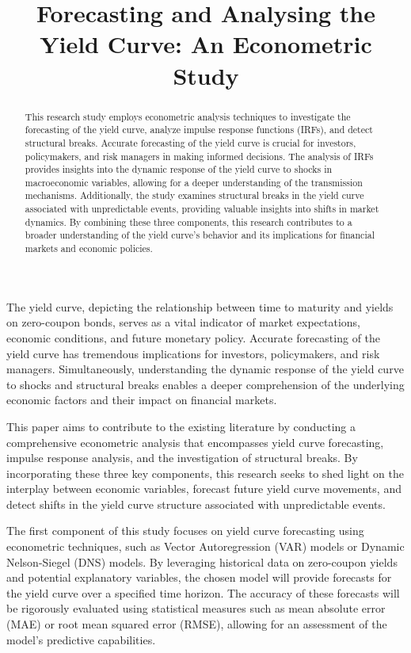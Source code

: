 \documentclass{vegaarticle}
\author{}
\title{Forecasting and Analysing the Yield Curve: An Econometric Study}
\date{}
\begin{document}
    \maketitle

    \begin{abstract}{}
        This research study employs econometric analysis techniques to investigate the forecasting of the yield curve, analyze impulse response functions (IRFs), and detect structural breaks. Accurate forecasting of the yield curve is crucial for investors, policymakers, and risk managers in making informed decisions. The analysis of IRFs provides insights into the dynamic response of the yield curve to shocks in macroeconomic variables, allowing for a deeper understanding of the transmission mechanisms. Additionally, the study examines structural breaks in the yield curve associated with unpredictable events, providing valuable insights into shifts in market dynamics. By combining these three components, this research contributes to a broader understanding of the yield curve's behavior and its implications for financial markets and economic policies.
    \end{abstract}

    \introduction
        The yield curve, depicting the relationship between time to maturity and yields on zero-coupon bonds, serves as a vital indicator of market expectations, economic conditions, and future monetary policy. Accurate forecasting of the yield curve has tremendous implications for investors, policymakers, and risk managers. Simultaneously, understanding the dynamic response of the yield curve to shocks and structural breaks enables a deeper comprehension of the underlying economic factors and their impact on financial markets.

        This paper aims to contribute to the existing literature by conducting a comprehensive econometric analysis that encompasses yield curve forecasting, impulse response analysis, and the investigation of structural breaks. By incorporating these three key components, this research seeks to shed light on the interplay between economic variables, forecast future yield curve movements, and detect shifts in the yield curve structure associated with unpredictable events.
        
        The first component of this study focuses on yield curve forecasting using econometric techniques, such as Vector Autoregression (VAR) models or Dynamic Nelson-Siegel (DNS) models. By leveraging historical data on zero-coupon yields and potential explanatory variables, the chosen model will provide forecasts for the yield curve over a specified time horizon. The accuracy of these forecasts will be rigorously evaluated using statistical measures such as mean absolute error (MAE) or root mean squared error (RMSE), allowing for an assessment of the model's predictive capabilities.
        
\end{document}
